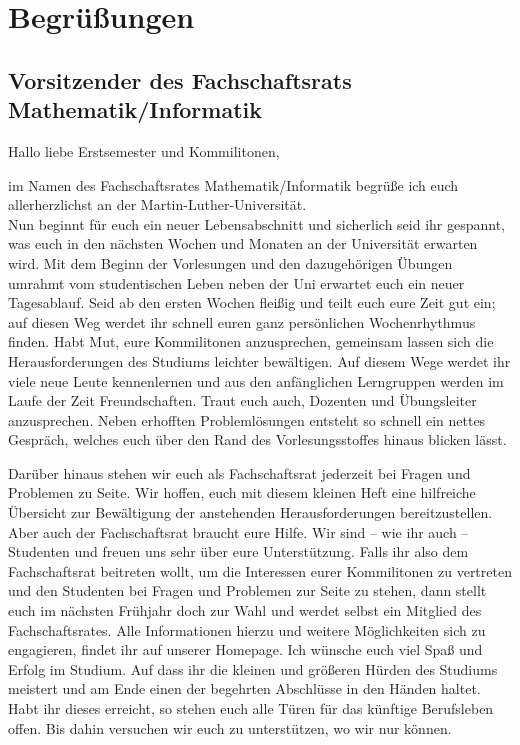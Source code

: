 \section{Begrüßungen}

\subsection{Vorsitzender des Fachschaftsrats Mathematik/Informatik}

Hallo liebe Erstsemester und Kommilitonen,

im Namen des Fachschaftsrates Mathematik/Informatik begrüße ich euch allerherzlichst an der Martin-Luther-Universität. \\
Nun beginnt für euch ein neuer Lebensabschnitt und sicherlich seid ihr gespannt, was euch in den nächsten Wochen und Monaten an der Universität erwarten wird. Mit dem Beginn der Vorlesungen und den dazugehörigen Übungen umrahmt vom studentischen Leben neben der Uni erwartet euch ein neuer Tagesablauf. 
Seid ab den ersten Wochen fleißig und teilt euch eure Zeit gut ein; auf diesen Weg werdet ihr schnell euren ganz persönlichen Wochenrhythmus finden.
Habt Mut, eure Kommilitonen anzusprechen, gemeinsam lassen sich die Herausforderungen des Studiums leichter bewältigen. Auf diesem Wege werdet ihr viele neue Leute kennenlernen und aus den anfänglichen Lerngruppen werden im Laufe der Zeit Freundschaften. Traut euch auch, Dozenten und Übungsleiter anzusprechen. Neben erhofften Problemlösungen entsteht so schnell ein nettes Gespräch, welches euch über den Rand des Vorlesungsstoffes hinaus blicken lässt.

Darüber hinaus stehen wir euch als Fachschaftsrat jederzeit bei Fragen und Problemen zu Seite. Wir hoffen, euch mit diesem kleinen Heft eine hilfreiche Übersicht zur Bewältigung der anstehenden Herausforderungen bereitzustellen.
Aber auch der Fachschaftsrat braucht eure Hilfe. Wir sind -- wie ihr auch -- Studenten und freuen uns sehr über eure Unterstützung. Falls ihr also dem Fachschaftsrat beitreten wollt, um die Interessen eurer Kommilitonen zu vertreten und den Studenten bei Fragen und Problemen zur Seite zu stehen, dann stellt euch im nächsten Frühjahr doch zur Wahl und werdet selbst ein Mitglied des Fachschaftsrates. Alle Informationen hierzu und weitere Möglichkeiten sich zu engagieren, findet ihr auf unserer Homepage.
Ich wünsche euch viel Spaß und Erfolg im Studium. Auf dass ihr die kleinen und größeren Hürden des Studiums meistert und am Ende einen der begehrten Abschlüsse in den Händen haltet. Habt ihr dieses erreicht, so stehen euch alle Türen für das künftige Berufsleben offen. Bis dahin versuchen wir euch zu unterstützen, wo wir nur können.

